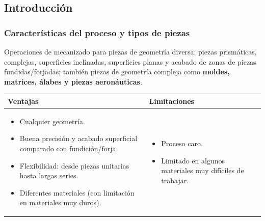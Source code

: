 \documentclass[12pt,a4paper]{article}
\begin{document}
\subsection{Introducción}

\subsubsection{Características del proceso y tipos de piezas}
Operaciones de mecanizado para piezas de geometría diversa: piezas prismáticas,
complejas, superficies inclinadas, superficies planas y acabado de zonas de
piezas fundidas/forjadas; también piezas de geometría compleja como
\textbf{moldes, matrices, álabes y piezas aeronáuticas}.

\begin{center}
	\begin{tabular}{@{}p{7.3cm}p{7.3cm}@{}}
		\toprule
		\textbf{Ventajas}
		                                                                            &
		\textbf{Limitaciones}
		\\
		\midrule
		\begin{itemize}[leftmargin=10pt,nosep]
			\item Cualquier geometría.
			\item Buena precisión y acabado superficial comparado con fundición/forja.
			\item Flexibilidad: desde piezas unitarias hasta largas series.
			\item Diferentes materiales (con limitación en materiales muy duros).
		\end{itemize} &
		\begin{itemize}[leftmargin=10pt,nosep]
			\item Proceso caro.
			\item Limitado en algunos materiales muy difíciles de trabajar.
		\end{itemize}               \\
		\bottomrule
	\end{tabular}
\end{center}
\end{document}
